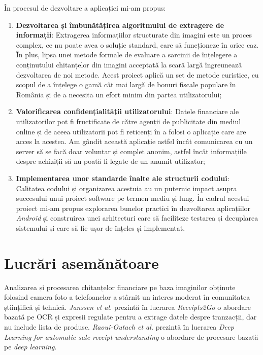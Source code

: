 În procesul de dezvoltare a aplicației \AppName{} mi-am propus:
\begin{enumerate}
  \item 
  \textbf{Dezvoltarea și îmbunătățirea algoritmului de extragere de informații}: Extragerea informațiilor structurate din imagini este un proces complex, ce nu poate avea o soluție standard, care să funcționeze în orice caz. În plus, lipsa unei metode formale de evaluare a sarcinii de înțelegere a conținutului chitanțelor din imagini acceptată la scară largă îngreunează dezvoltarea de noi metode. Acest proiect aplică un set de metode euristice, cu scopul de a înțelege o gamă cât mai largă de bonuri fiscale populare în România și de a necesita un efort minim din partea utilizatorului;
  \item
  \textbf{Valorificarea confidențialității utilizatorului}: Datele financiare ale utilizatorilor pot fi fructificate de către agenții de publicitate din mediul online și de aceea utilizatorii pot fi reticenți în a folosi o aplicație care are acces la acestea. Am gândit această aplicație astfel încât comunicarea cu un server să se facă doar voluntar și complet anonim, astfel încât informațiile despre achiziții să nu poată fi legate de un anumit utilizator;
  \item
  \textbf{Implementarea unor standarde înalte ale structurii codului}: Calitatea codului și organizarea acestuia au un puternic impact asupra succesului unui proiect software pe termen mediu și lung. În cadrul acestui proiect mi-am propus explorarea bunelor practici în dezvoltarea aplicațiilor \emph{Android} și construirea unei arhitecturi care să faciliteze testarea și decuplarea sistemului și care să fie ușor de înțeles și implementat.
\end{enumerate}

\section{Lucrări asemănătoare}\label{related_intro}

Analizarea și procesarea chitanțelor financiare pe baza imaginilor obținute folosind camera foto a telefoanelor a stârnit un interes moderat în comunitatea științifică și tehnică. \emph{Janssen et al.} prezintă în lucrarea \emph{Receipts2Go} \cite{Receipts2Go} o abordare bazată pe OCR și expresii regulate pentru a extrage datele despre tranzacții, dar nu include lista de produse. \emph{Raoui-Outach et al.} prezintă în lucrarea \emph{Deep Learning for automatic sale receipt understanding} \cite{DL_receipt_understanding} o abordare de procesare bazată pe \emph{deep learning}.

